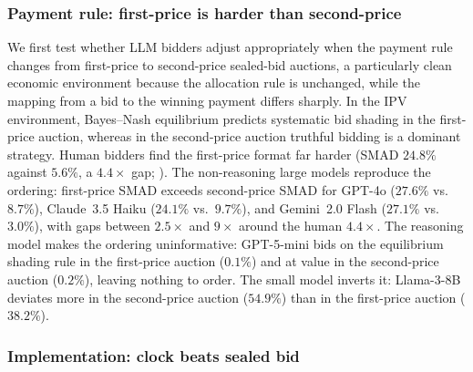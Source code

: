 \documentclass[acmsmall,screen,review]{acmart}
\begin{document}
\subsubsection{\texorpdfstring{Payment rule: first-price is harder than second-price}{Payment rule: first-price is harder than second-price}}

We first test whether LLM bidders adjust appropriately when the payment rule changes from first-price to second-price sealed-bid auctions, a particularly clean economic environment because the allocation rule is unchanged, while the mapping from a bid to the winning payment differs sharply. In the IPV environment, Bayes--Nash equilibrium predicts systematic bid shading in the first-price auction, whereas in the second-price auction truthful bidding is a dominant strategy. Human bidders find the first-price format far harder (SMAD $24.8\%$ against $5.6\%$, a $4.4\times$ gap; \citealp{kagel1993independent}). The non-reasoning large models reproduce the ordering: first-price SMAD exceeds second-price SMAD for GPT-4o ($27.6\%$ vs.\ $8.7\%$), Claude~3.5 Haiku ($24.1\%$ vs.\ $9.7\%$), and Gemini~2.0 Flash ($27.1\%$ vs.\ $3.0\%$), with gaps between $2.5\times$ and $9\times$ around the human $4.4\times$. The reasoning model makes the ordering uninformative: GPT-5-mini bids on the equilibrium shading rule in the first-price auction ($0.1\%$) and at value in the second-price auction ($0.2\%$), leaving nothing to order. The small model inverts it: Llama-3-8B deviates more in the second-price auction ($54.9\%$) than in the first-price auction ($38.2\%$).

\subsubsection{\texorpdfstring{Implementation: clock beats sealed bid}{Implementation: clock beats sealed bid}}
\end{document}
